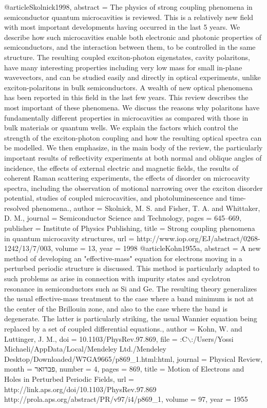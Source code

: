 @article{Skolnick1998,
abstract = {The physics of strong coupling phenomena in semiconductor quantum microcavities is reviewed. This is a relatively new field with most important developments having occurred in the last 5 years. We describe how such microcavities enable both electronic and photonic properties of semiconductors, and the interaction between them, to be controlled in the same structure. The resulting coupled exciton-photon eigenstates, cavity polaritons, have many interesting properties including very low mass for small in-plane wavevectors, and can be studied easily and directly in optical experiments, unlike exciton-polaritons in bulk semiconductors. A wealth of new optical phenomena has been reported in this field in the last few years. This review describes the most important of these phenomena. We discuss the reasons why polaritons have fundamentally different properties in microcavities as compared with those in bulk materials or quantum wells. We explain the factors which control the strength of the exciton-photon coupling and how the resulting optical spectra can be modelled. We then emphasize, in the main body of the review, the particularly important results of reflectivity experiments at both normal and oblique angles of incidence, the effects of external electric and magnetic fields, the results of coherent Raman scattering experiments, the effects of disorder on microcavity spectra, including the observation of motional narrowing over the exciton disorder potential, studies of coupled microcavities, and photoluminescence and time-resolved phenomena.},
author = {Skolnick, M. S. and Fisher, T. A. and Whittaker, D. M.},
journal = {Semiconductor Science and Technology},
pages = {645--669},
publisher = {Institute of Physics Publishing},
title = {{Strong coupling phenomena in quantum microcavity structures}},
url = {http://www.iop.org/EJ/abstract/0268-1242/13/7/003},
volume = {13},
year = {1998}
}
@article{Kohn1955a,
abstract = {A new method of developing an "effective-mass" equation for electrons moving in a perturbed periodic structure is discussed. This method is particularly adapted to such problems as arise in connection with impurity states and cyclotron resonance in semiconductors such as Si and Ge. The resulting theory generalizes the usual effective-mass treatment to the case where a band minimum is not at the center of the Brillouin zone, and also to the case where the band is degenerate. The latter is particularly striking, the usual Wannier equation being replaced by a set of coupled differential equations.},
author = {Kohn, W. and Luttinger, J. M.},
doi = {10.1103/PhysRev.97.869},
file = {:C$\backslash$:/Users/Yossi Michaeli/AppData/Local/Mendeley Ltd./Mendeley Desktop/Downloaded/W7GA9665/p869\_1.html:html},
journal = {Physical Review},
month = {פברואר},
number = {4},
pages = {869},
title = {{Motion of Electrons and Holes in Perturbed Periodic Fields}},
url = {http://link.aps.org/doi/10.1103/PhysRev.97.869 http://prola.aps.org/abstract/PR/v97/i4/p869\_1},
volume = {97},
year = {1955}
}
